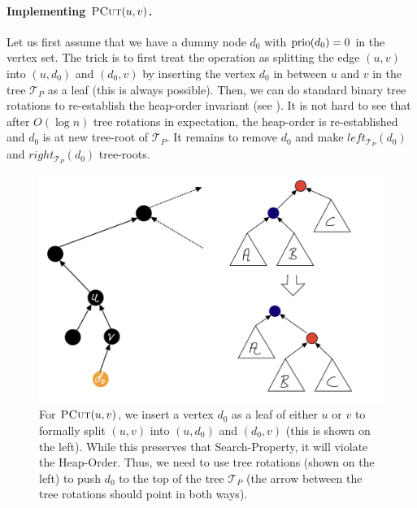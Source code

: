 \paragraph{Implementing $\textsc{PCut}(u,v)$.} Let us first assume that we have a dummy node $d_0$ with $\operatorname{prio}(d_0) = 0$ in the vertex set. The trick is to first treat the operation as splitting the edge $(u,v)$ into $(u,d_0)$ and $(d_0,v)$ by inserting the vertex $d_0$ in between $u$ and $v$ in the tree $\mathcal{T}_{P}$ as a leaf (this is always possible). Then, we can do standard binary tree rotations to re-establish the heap-order invariant (see ). It is not hard to see that after $O(\log n)$ tree rotations in expectation, the heap-order is re-established and $d_0$ is at new tree-root of $\mathcal{T}_{P}$. It remains to remove $d_0$ and make $left_{\mathcal{T}_{P}}(d_0)$ and $right_{\mathcal{T}_{P}}(d_0)$ tree-roots.

\begin{figure}[!ht]
    \centering
    \includegraphics[scale=0.2]{./fig/PathCutOperation_lectureDynamicTree.jpeg}
    \caption{For $\textsc{PCut}(u,v)$, we insert a vertex $d_0$ as a leaf of either $u$ or $v$ to formally split $(u,v)$ into $(u,d_0)$ and $(d_0,v)$ (this is shown on the left). While this preserves that Search-Property, it will violate the Heap-Order. Thus, we need to use tree rotations (shown on the left) to push $d_0$ to the top of the tree $\mathcal{T}_{P}$ (the arrow between the tree rotations should point in both ways).}
    \label{fig:PCutRotation}
\end{figure}

